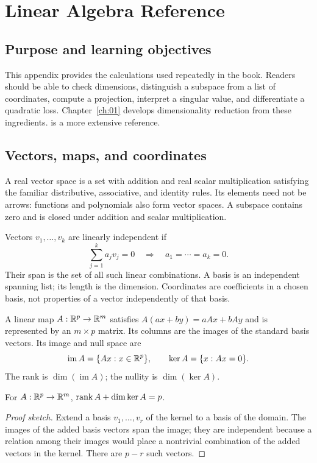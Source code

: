\chapter{Linear Algebra Reference}\label{app:a}

\section*{Purpose and learning objectives}
This appendix provides the calculations used repeatedly in the book. Readers should be able to check dimensions, distinguish a subspace from a list of coordinates, compute a projection, interpret a singular value, and differentiate a quadratic loss. Chapter~\ref{ch:01} develops dimensionality reduction from these ingredients. \citet{ev_axler2024} is a more extensive reference.

\section{Vectors, maps, and coordinates}
A real vector space is a set with addition and real scalar multiplication satisfying the familiar distributive, associative, and identity rules. Its elements need not be arrows: functions and polynomials also form vector spaces. A subspace contains zero and is closed under addition and scalar multiplication.

Vectors \(v_1,\ldots,v_k\) are linearly independent if
\[
\sum_{j=1}^k a_jv_j=0\quad\Longrightarrow\quad a_1=\cdots=a_k=0.
\]
Their span is the set of all such linear combinations. A basis is an independent spanning list; its length is the dimension. Coordinates are coefficients in a chosen basis, not properties of a vector independently of that basis.

A linear map \(A:\mathbb{R}^p\to\mathbb{R}^m\) satisfies \(A(ax+by)=aAx+bAy\) and is represented by an \(m\times p\) matrix. Its columns are the images of the standard basis vectors. Its image and null space are
\[
\operatorname{im}A=\{Ax:x\in\mathbb{R}^p\},\qquad
\ker A=\{x:Ax=0\}.
\]
The rank is \(\dim(\operatorname{im}A)\); the nullity is \(\dim(\ker A)\).

\begin{theorem}
For \(A:\mathbb{R}^p\to\mathbb{R}^m\), \(\operatorname{rank} A+\dim\ker A=p\).
\end{theorem}
\begin{proof}[Proof sketch]
Extend a basis \(v_1,\ldots,v_r\) of the kernel to a basis of the domain. The images of the added basis vectors span the image; they are independent because a relation among their images would place a nontrivial combination of the added vectors in the kernel. There are \(p-r\) such vectors.
\end{proof}

